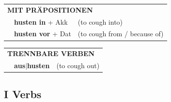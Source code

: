 \documentclass[10pt,a4paper]{revtex4-2}
\begin{document}
\begin{verbbox}
\vspace{10pt}

\begin{tabular}{lll}
\multicolumn{3}{l}{\textbf{MIT PRÄPOSITIONEN}}\\
& \textbf{husten in} + Akk & (to cough into)\\
& \textbf{husten vor} + Dat & (to cough from / because of)\\
\end{tabular}
\hfill
\begin{tabular}{lll}
\multicolumn{3}{l}{\textbf{TRENNBARE VERBEN}}\\
& \textbf{aus$|$husten} & (to cough out)\\
\end{tabular}
\vspace{-5pt}
\end{verbbox}

\subsection{I Verbs}
\end{document}
